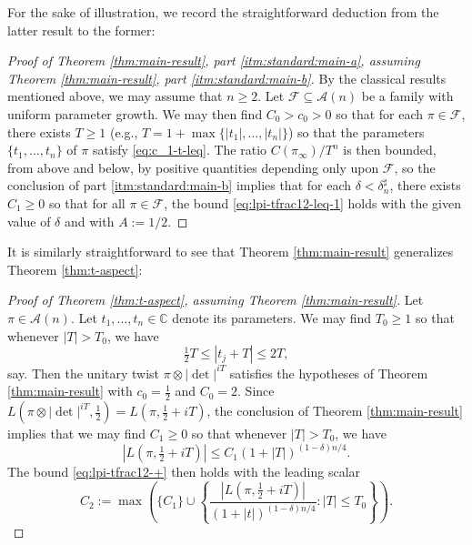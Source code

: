 \documentclass[reqno]{amsart}
\theoremstyle{plain} \newtheorem{theorem} {Theorem}
\theoremstyle{definition} \newtheorem{definition} [theorem] {Definition}
\theoremstyle{itplain} %
\numberwithin{equation}{section}
\numberwithin{theorem}{section}
\renewcommand{\geq}{\geqslant}
\renewcommand{\leq}{\leqslant}
\begin{document}
For the sake of illustration, we record the straightforward deduction from the latter result to the former:
\begin{proof}[Proof of Theorem \ref{thm:main-result}, part \eqref{itm:standard:main-a}, assuming Theorem \ref{thm:main-result}, part \eqref{itm:standard:main-b}]
  By the classical results mentioned above, we may assume that $n \geq 2$.  Let $\mathcal{F} \subseteq \mathcal{A}(n)$ be a family with uniform parameter growth.  We may then find $C_0 > c_0 > 0$ so that for each $\pi \in \mathcal{F}$, there exists $T \geq 1$ (e.g., $T = 1 + \max \{|t_1|, \dotsc, |t_n|\}$) so that the parameters $\{t_1,\dotsc,t_n\}$ of $\pi$ satisfy \eqref{eq:c_1-t-leq}.  The ratio $C(\pi_\infty) / T^n$ is then bounded, from above and below, by positive quantities depending only upon $\mathcal{F}$, so the conclusion of part \eqref{itm:standard:main-b} implies that for each $\delta <  \delta_n ^\sharp$, there exists $C_1 \geq 0$ so that for all $\pi \in \mathcal{F}$, the bound \eqref{eq:lpi-tfrac12-leq-1} holds with the given value of $\delta$ and with $A := 1/2$.
\end{proof}

It is similarly straightforward to see that Theorem \ref{thm:main-result} generalizes Theorem \ref{thm:t-aspect}:
\begin{proof}[Proof of Theorem \ref{thm:t-aspect}, assuming Theorem \ref{thm:main-result}]
  Let $\pi \in \mathcal{A}(n)$.  Let $t_1, \dotsc, t_n \in \mathbb{C}$ denote its parameters.  We may find $T_0 \geq 1$ so that whenever $|T| > T_0$, we have
  \begin{equation*}
    \tfrac{1}{2} T \leq |t_j + T | \leq 2 T,
  \end{equation*}
  say.  Then the unitary twist $\pi \otimes |\det|^{i T}$ satisfies the hypotheses of Theorem \ref{thm:main-result} with $c_0 = \tfrac{1}{2}$ and $C_0 = 2$.  Since $L(\pi \otimes |\det|^{iT}, \tfrac{1}{2}) = L(\pi, \tfrac{1}{2} + i T)$, the conclusion of Theorem \ref{thm:main-result} implies that we may find $C_1 \geq 0$ so that whenever $|T| > T_0$, we have
  \begin{equation*}
    |L(\pi, \tfrac{1}{2} + i T)| \leq C_1 ( 1 + |T|)^{(1 - \delta) n/4}.
  \end{equation*}
  The bound \eqref{eq:lpi-tfrac12-+} then holds with the leading scalar
  \begin{equation*}
    C_2 := \max \left(\{C_1\} \cup \left\{ \frac{|L(\pi,\tfrac{1}{2} + i T)|}{(1 + |t|)^{(1 - \delta) n/4}} : |T| \leq T_0 \right\}\right).
  \end{equation*}
\end{proof}
\end{document}
